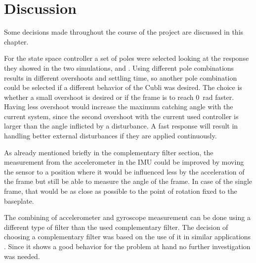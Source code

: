 \chapter{Discussion}
Some decisions made throughout the course of the project are discussed in this chapter. 

For the state space controller a set of poles were selected looking at the response they showed in the two simulations,  and . Using different pole combinations results in different overshoots and settling time, so another pole combination could be selected if a different behavior of the Cubli was desired. 
The choice is whether a small overshoot is desired or if the frame is to reach \SI{0}{rad} faster. 
Having less overshoot would increase the maximum catching angle with the current system, since the second overshoot with the current used controller is larger than the angle inflicted by a disturbance. A fast response will result in handling better external disturbances if they are applied continuously.

As already mentioned briefly in the complementary filter section, the measurement from the accelerometer in the IMU could be improved by moving the sensor to a position where it would be influenced less by the acceleration of the frame but still be able to measure the angle of the frame. In case of the single frame, that would be as close as possible to the point of rotation fixed to the baseplate.

The combining of accelerometer and gyroscope measurement can be done using a different type of filter than the used complementary filter. The decision of choosing a complementary filter was based on the use of it in similar applications \cite{OlliW}. Since it shows a good behavior for the problem at hand no further investigation was needed.

%

